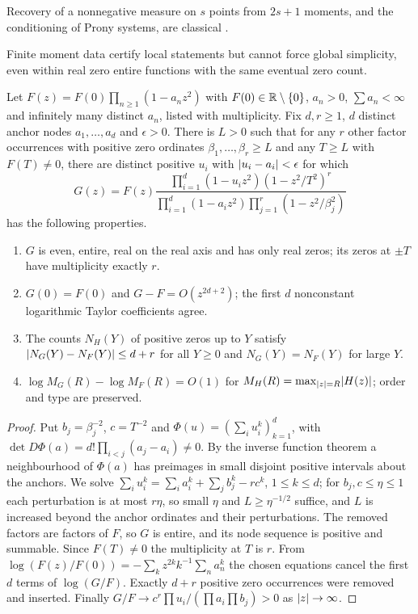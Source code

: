 Recovery of a nonnegative measure on $s$ points from $2s+1$ moments, and the conditioning of Prony
systems, are classical \cite{DeCastroGamboa2012Exact,BatenkovYomdin2013Accuracy}.

Finite moment data certify local statements but cannot force global simplicity, even within real
zero entire functions with the same eventual zero count.

\begin{theorem}\label{li:thm:surgery}
Let $F(z)=F(0)\prod_{n\ge1}(1-a_nz^2)$ with $F(0)\in\mathbb{R}\setminus\{0\}$, $a_n>0$, $\sum a_n<\infty$ and
infinitely many distinct $a_n$, listed with multiplicity. Fix $d,r\ge1$, $d$ distinct anchor nodes
$a_1,\dots,a_d$ and $\epsilon>0$. There is $L>0$ such that for any $r$ other factor occurrences
with positive zero ordinates $\beta_1,\dots,\beta_r\ge L$ and any $T\ge L$ with $F(T)\ne0$, there are
distinct positive $u_i$ with $\lvert u_i-a_i\rvert<\epsilon$ for which
\begin{equation}\label{li:eq:surgery}
 G(z)=F(z)\frac{\prod_{i=1}^d(1-u_iz^2)(1-z^2/T^2)^r}{\prod_{i=1}^d(1-a_iz^2)\prod_{j=1}^r(1-z^2/\beta_j^2)}
\end{equation}
has the following properties.
\begin{enumerate}[label=\textup{(\roman*)}]
\item $G$ is even, entire, real on the real axis and has only real zeros; its zeros at $\pm T$ have
 multiplicity exactly $r$.
\item $G(0)=F(0)$ and $G-F=O(z^{2d+2})$; the first $d$ nonconstant logarithmic Taylor coefficients
 agree.
\item The counts $N_H(Y)$ of positive zeros up to $Y$ satisfy $\lvert N_G(Y)-N_F(Y)\rvert\le d+r$ for all
 $Y\ge0$ and $N_G(Y)=N_F(Y)$ for large $Y$.
\item $\log M_G(R)-\log M_F(R)=O(1)$ for $M_H(R)=\max_{\lvert z\rvert=R}\lvert H(z)\rvert$; order and type are
 preserved.
\end{enumerate}
\end{theorem}

\begin{proof}
Put $b_j=\beta_j^{-2}$, $c=T^{-2}$ and $\Phi(u)=(\sum_iu_i^k)_{k=1}^d$, with
$\det D\Phi(a)=d!\prod_{i<j}(a_j-a_i)\ne0$. By the inverse function theorem a neighbourhood of
$\Phi(a)$ has preimages in small disjoint positive intervals about the anchors. We solve
$\sum_iu_i^k=\sum_ia_i^k+\sum_jb_j^k-rc^k$, $1\le k\le d$; for $b_j,c\le\eta\le1$ each perturbation is at
most $r\eta$, so small $\eta$ and $L\ge\eta^{-1/2}$ suffice, and $L$ is increased beyond the anchor
ordinates and their perturbations. The removed factors are factors of $F$, so $G$ is entire, and its
node sequence is positive and summable. Since $F(T)\ne0$ the multiplicity at $T$ is $r$. From
$\log(F(z)/F(0))=-\sum_kz^{2k}k^{-1}\sum_na_n^k$ the chosen equations cancel the first $d$ terms of
$\log(G/F)$. Exactly $d+r$ positive zero occurrences were removed and inserted. Finally
$G/F\to c^r\prod u_i/(\prod a_i\prod b_j)>0$ as $\lvert z\rvert\to\infty$.
\end{proof}

